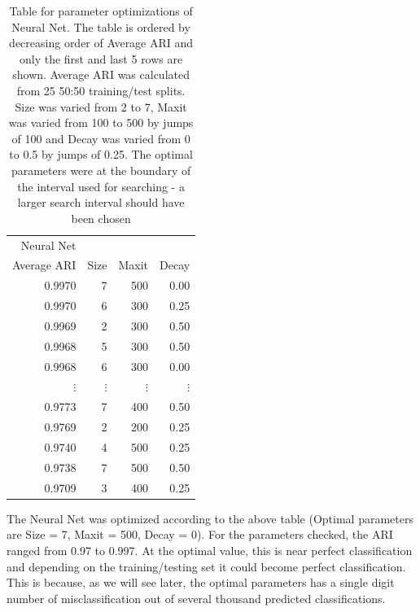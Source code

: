 \documentclass[float=false, crop=false]{standalone}
\begin{document}
\begin{table} \label{tab: paramNnet}
\begin{tabular}{rrrr}
  \hline
  Neural Net&&& \\ 
 Average ARI & Size & Maxit & Decay \\ 
  \hline
0.9970 & 7 & 500 & 0.00 \\ 
  0.9970 & 6 & 300 & 0.25 \\ 
  0.9969 & 2 & 300 & 0.50 \\ 
  0.9968 & 5 & 300 & 0.50 \\ 
  0.9968 & 6 & 300 & 0.00 \\ 
  $\vdots $ & $\vdots $ & $\vdots $ & $\vdots $ \\ 
 0.9773 & 7 & 400 & 0.50 \\ 
  0.9769 & 2 & 200 & 0.25 \\ 
  0.9740 & 4 & 500 & 0.25 \\ 
  0.9738 & 7 & 500 & 0.50 \\ 
  0.9709 & 3 & 400 & 0.25 \\ 
   \hline
\end{tabular}
\caption{Table for parameter optimizations of Neural Net. The table is ordered by decreasing order of Average ARI and only the first and last 5 rows are shown. Average ARI was calculated from 25 50:50 training/test splits. Size was varied from 2 to 7, Maxit was varied from 100 to 500 by jumps of 100 and Decay was varied from 0 to 0.5 by jumps of 0.25. The optimal parameters were at the boundary of the interval used for searching - a larger search interval should have been chosen }
\end{table}

The Neural Net was optimized according to the above table (Optimal parameters are Size = 7, Maxit = 500, Decay = 0). For the parameters checked, the ARI ranged from 0.97 to 0.997. At the optimal value, this is near perfect classification and depending on the training/testing set it could become perfect classification. This is because, as we will see later, the optimal parameters has a single digit number of misclassification out of several thousand predicted classifications. 
\end{document}

